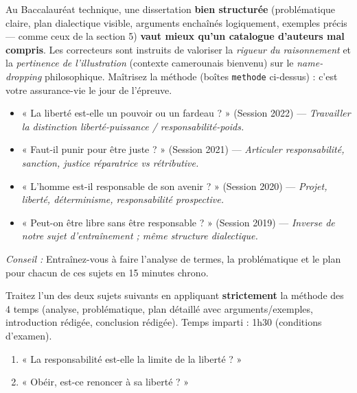 \documentclass[11pt]{article}
\begin{document}
\begin{savaistu}
Au Baccalauréat technique, une dissertation \textbf{bien structurée} (problématique claire, plan dialectique visible, arguments enchaînés logiquement, exemples précis — comme ceux de la section 5) \textbf{vaut mieux qu'un catalogue d'auteurs mal compris}. Les correcteurs sont instruits de valoriser la \emph{rigueur du raisonnement} et la \emph{pertinence de l'illustration} (contexte camerounais bienvenu) sur le \emph{name-dropping} philosophique. Maîtrisez la méthode (boîtes \texttt{methode} ci-dessus) : c'est votre assurance-vie le jour de l'épreuve.
\end{savaistu}

\begin{exemplebox}
\begin{itemize}
    \item « La liberté est-elle un pouvoir ou un fardeau ? » (Session 2022) — \emph{Travailler la distinction liberté-puissance / responsabilité-poids.}
    \item « Faut-il punir pour être juste ? » (Session 2021) — \emph{Articuler responsabilité, sanction, justice réparatrice vs rétributive.}
    \item « L'homme est-il responsable de son avenir ? » (Session 2020) — \emph{Projet, liberté, déterminisme, responsabilité prospective.}
    \item « Peut-on être libre sans être responsable ? » (Session 2019) — \emph{Inverse de notre sujet d'entraînement ; même structure dialectique.}
\end{itemize}
\emph{Conseil :} Entraînez-vous à faire l'analyse de termes, la problématique et le plan pour chacun de ces sujets en 15 minutes chrono.
\end{exemplebox}

\begin{exercice}
Traitez l'un des deux sujets suivants en appliquant \textbf{strictement} la méthode des 4 temps (analyse, problématique, plan détaillé avec arguments/exemples, introduction rédigée, conclusion rédigée). Temps imparti : 1h30 (conditions d'examen).
\begin{enumerate}
    \item « La responsabilité est-elle la limite de la liberté ? »
    \item « Obéir, est-ce renoncer à sa liberté ? »
\end{enumerate}
\end{exercice}
\end{document}
